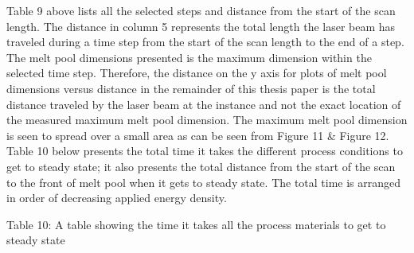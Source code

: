 \documentclass[10pt]{article}
\begin{document}
Table 9 above lists all the selected steps and distance from the start of the scan length. The distance in column 5 represents the total length the laser beam has traveled during a time step from the start of the scan length to the end of a step. The melt pool dimensions presented is the maximum dimension within the selected time step. Therefore, the distance on the y axis for plots of melt pool dimensions versus distance in the remainder of this thesis paper is the total distance traveled by the laser beam at the instance and not the exact location of the measured maximum melt pool dimension. The maximum melt pool dimension is seen to spread over a small area as can be seen from Figure 11 \& Figure 12. Table 10 below presents the total time it takes the different process conditions to get to steady state; it also presents the total distance from the start of the scan to the front of melt pool when it gets to steady state. The total time is arranged in order of decreasing applied energy density.

Table 10: A table showing the time it takes all the process materials to get to steady state
\end{document}
